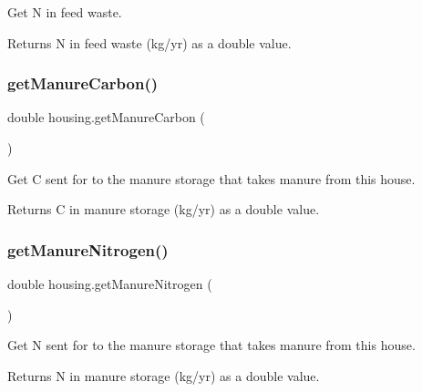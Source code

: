 Get N in feed waste. 

\begin{DoxyReturn}{Returns}
N in feed waste (kg/yr) as a double value. 
\end{DoxyReturn}
\mbox{\label{classhousing_aa1b989203ae13ab9cc37388e86039857}} 
\subsubsection{\texorpdfstring{getManureCarbon()}{getManureCarbon()}}
{\footnotesize\ttfamily double housing.\+get\+Manure\+Carbon (\begin{DoxyParamCaption}{ }\end{DoxyParamCaption})\hspace{0.3cm}{\ttfamily [inline]}}



Get C sent for to the manure storage that takes manure from this house. 

\begin{DoxyReturn}{Returns}
C in manure storage (kg/yr) as a double value. 
\end{DoxyReturn}
\mbox{\label{classhousing_aa33ebd3c77c96f5b100769c79dc88ecb}} 
\subsubsection{\texorpdfstring{getManureNitrogen()}{getManureNitrogen()}}
{\footnotesize\ttfamily double housing.\+get\+Manure\+Nitrogen (\begin{DoxyParamCaption}{ }\end{DoxyParamCaption})\hspace{0.3cm}{\ttfamily [inline]}}



Get N sent for to the manure storage that takes manure from this house. 

\begin{DoxyReturn}{Returns}
N in manure storage (kg/yr) as a double value. 
\end{DoxyReturn}
\mbox{\label{classhousing_a470209947b645d13f08b36e81b376c83}} 
